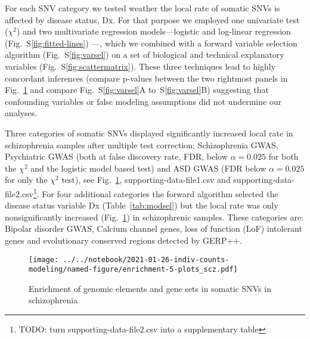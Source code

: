 \documentclass[letterpaper]{article}
\begin{document}
For each SNV category we tested weather the local rate of somatic SNVs is
affected by disease status, Dx.  For that purpose we employed one univariate test
($\chi^2$) and two multivariate regression models---logistic and log-linear
regression (Fig.~S\ref{fig:fitted-lines}) ---, which we combined with a forward
variable selection algorithm (Fig.~S\ref{fig:varsel}) on a set of biological
and technical explanatory variables (Fig.~S\ref{fig:scattermatrix}).  These three techniques
lead to highly concordant inferences (compare p-values between the two
rightmost panels in Fig.~\ref{fig:testresults} and compare
Fig.~S\ref{fig:varsel}A to~S\ref{fig:varsel}B) suggesting that confounding variables or false
modeling assumptions did not undermine our analyses.

Three categories of somatic SNVs displayed significantly increased local rate
in schizophrenia samples after multiple test correction: Schizophrenia GWAS,
Psychiatric GWAS (both at false discovery rate, FDR, below $\alpha=0.025$ for
both the $\chi^2$ and the logistic model based test) and ASD GWAS (FDR below
$\alpha=0.025$ for only the $\chi^2$ test), see Fig.~\ref{fig:testresults},
supporting-data-file1.csv and supporting-data-file2.csv\footnote{TODO: turn
supporting-data-file2.csv into a supplementary table}.  For four
additional categories the forward algorithm selected the disease
status variable Dx (Table~\ref{tab:modsel}) but the local rate was
only nonsignificantly increased (Fig.~\ref{fig:testresults}) in
schizophrenic samples. These categories are: Bipolar disorder GWAS,
Calcium channel genes, loss of function (LoF) intolerant genes and
evolutionary conserved regions detected by GERP++.

\begin{figure}
\texttt{[image: ../../notebook/2021-01-26-indiv-counts-modeling/named-figure/enrichment-5-plots\_scz.pdf]}
\caption{Enrichment of genomic elements and gene sets in somatic SNVs in schizophrenia}
\label{fig:testresults}
\end{figure}
\end{document}
